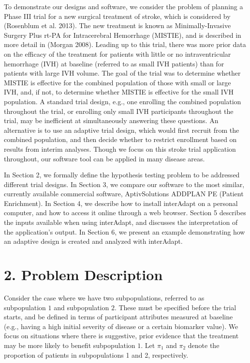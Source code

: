 \documentclass{article}
\newcommand{\interAdapt}{\textsf{interAdapt }}
\begin{document}
To demonstrate our designs and software, we consider the problem of 
 planning a Phase III trial for a new surgical treatment of stroke, which is considered by (Rosenblum et al. 2013)\cite{Rosenblum2013AdaptMISTIE}.
The new treatment is known as Minimally-Invasive Surgery Plus rt-PA for Intracerebral Hemorrhage (MISTIE), and is described in more detail in (Morgan 2008)\cite{MISTIE_prelim2008}. Leading up to this trial, there was more prior data on the efficacy of the treatment for patients with little or no intraventricular hemorrhage (IVH) at baseline (referred to as small IVH patients) than for patients with large IVH volume. The goal of the trial was to determine whether MISTIE is effective for the combined population of those with small or large IVH, and, if not, to determine whether MISTIE is effective for the small IVH population. A standard trial design, e.g., one enrolling the combined population throughout the trial, or enrolling only small IVH participants throughout the trial, may be inefficient at simultaneously answering these questions.
An alternative is to use an adaptive trial design, which would first recruit from the combined population, and then decide whether to restrict enrollment based on results from interim  analyses. %
Though we focus on this stroke trial application throughout, our software tool can be applied in many disease areas.

In Section 2, we  formally define the hypothesis testing problem to be addressed different trial designs. In Section 3, we compare our software to the most similar, currently available commercial software, AptivSolutions ADDPLAN PE (Patient Enrichment). 
In Section 4, we describe how to install \interAdapt on a personal computer, and how to access it online through a web browser. Section 5 describes the inputs available when using \textsf{interAdapt}, and discusses the interpretation of the application's output. In Section 6, we present an example demonstrating how an adaptive design is  created and analyzed with \textsf{interAdapt}. 

\section*{2. Problem Description}

Consider the case where we have two subpopulations, referred to as subpopulation $1$ and subpopulation $2$. These must be specified before the trial starts, and be defined in terms of participant attributes measured at baseline (e.g., having a high initial severity of disease or a certain biomarker value). 
We focus on situations where  there is suggestive, prior evidence that the treatment may be more likely to benefit subpopulation $1$.
Let $π_1$ and $π_2$ denote the proportion of patients in subpopulations 1 and 2, respectively. 
\end{document}

